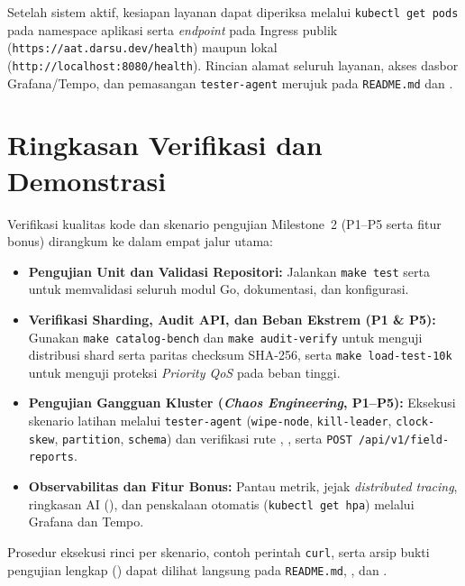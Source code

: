 \noindent Setelah sistem aktif, kesiapan layanan dapat diperiksa melalui \texttt{kubectl get pods} pada namespace aplikasi serta \textit{endpoint}  pada Ingress publik (\nolinkurl{https://aat.darsu.dev/health}) maupun lokal (\nolinkurl{http://localhost:8080/health}). Rincian alamat seluruh layanan, akses dasbor Grafana/Tempo, dan pemasangan \texttt{tester-agent} merujuk pada \texttt{README.md} dan .

\section{Ringkasan Verifikasi dan Demonstrasi}
\label{sec:petunjuk_verifikasi}

Verifikasi kualitas kode dan skenario pengujian Milestone~2 (P1--P5 serta fitur bonus) dirangkum ke dalam empat jalur utama:

\begin{itemize}
    \item \textbf{Pengujian Unit dan Validasi Repositori:} Jalankan \texttt{make test} serta  untuk memvalidasi seluruh modul Go, dokumentasi, dan konfigurasi.
    \item \textbf{Verifikasi Sharding, Audit API, dan Beban Ekstrem (P1 \& P5):} Gunakan \texttt{make catalog-bench} dan \texttt{make audit-verify} untuk menguji distribusi shard serta paritas checksum SHA-256, serta \texttt{make load-test-10k} untuk menguji proteksi \textit{Priority QoS} pada beban tinggi.
    \item \textbf{Pengujian Gangguan Kluster (\textit{Chaos Engineering}, P1--P5):} Eksekusi skenario latihan melalui \texttt{tester-agent} (\texttt{wipe-node}, \texttt{kill-leader}, \texttt{clock-skew}, \texttt{partition}, \texttt{schema}) dan verifikasi rute , , serta \texttt{POST /api/v1/field-reports}.
    \item \textbf{Observabilitas dan Fitur Bonus:} Pantau metrik, jejak \textit{distributed tracing}, ringkasan AI (), dan penskalaan otomatis (\texttt{kubectl get hpa}) melalui Grafana dan Tempo.
\end{itemize}

\noindent Prosedur eksekusi rinci per skenario, contoh perintah \texttt{curl}, serta arsip bukti pengujian lengkap () dapat dilihat langsung pada \texttt{README.md}, , dan .

